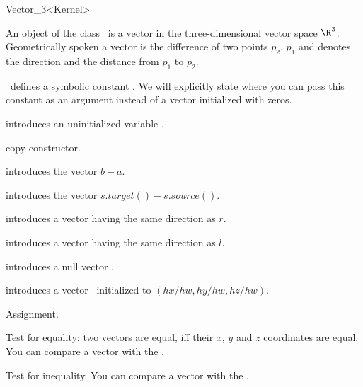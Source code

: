 \begin{ccRefClass} {Vector_3<Kernel>}

\ccDefinition

An object of the class \ccRefName\ is a vector in the three-dimensional 
vector space $\R^3$. Geometrically spoken a vector is the difference
of two points $p_2$, $p_1$ and denotes the direction and the distance
from   $p_1$ to $p_2$. 

\cgal\ defines a symbolic constant . We 
will explicitly state where you can pass this constant as an argument
instead of a vector initialized with zeros.


\ccCreation
{}


\ccHidden{}
             {introduces an uninitialized variable \ccVar.}

\ccHidden {}
            {copy constructor.}

            {introduces the vector $b-a$.}

            {introduces the vector $s.target()-s.source()$.}

            {introduces a vector having the same direction as $r$.}

            {introduces a vector having the same direction as $l$.}

            {introduces a null vector \ccVar.}

            {introduces a vector \ccVar\ initialized to $(hx/hw, hy/hw, hz/hw)$.}


\ccOperations

\ccHidden {}
        {Assignment.}

       {Test for equality: two vectors are equal, iff their $x$, $y$ 
        and $z$ coordinates are equal. You can compare a vector with the
        .}

       {Test for inequality. You can compare a vector with the
        .}


\end{ccRefClass}
